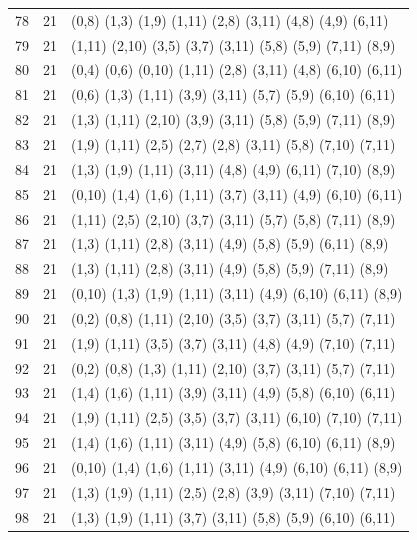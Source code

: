 \begin{appendix}
{\begin{longtable}{lll}
    78 & 21 & (0,8)   (1,3)   (1,9)   (1,11)  (2,8)   (3,11)  (4,8)   (4,9)   (6,11)\\
    79 & 21 & (1,11)  (2,10)  (3,5)   (3,7)   (3,11)  (5,8)   (5,9)   (7,11)  (8,9)\\
    80 & 21 & (0,4)   (0,6)   (0,10)  (1,11)  (2,8)   (3,11)  (4,8)   (6,10)  (6,11)\\
    81 & 21 & (0,6)   (1,3)   (1,11)  (3,9)   (3,11)  (5,7)   (5,9)   (6,10)  (6,11)\\
    82 & 21 & (1,3)   (1,11)  (2,10)  (3,9)   (3,11)  (5,8)   (5,9)   (7,11)  (8,9)\\
    83 & 21 & (1,9)   (1,11)  (2,5)   (2,7)   (2,8)   (3,11)  (5,8)   (7,10)  (7,11)\\
    84 & 21 & (1,3)   (1,9)   (1,11)  (3,11)  (4,8)   (4,9)   (6,11)  (7,10)  (8,9)\\
    85 & 21 & (0,10)  (1,4)   (1,6)   (1,11)  (3,7)   (3,11)  (4,9)   (6,10)  (6,11)\\
    86 & 21 & (1,11)  (2,5)   (2,10)  (3,7)   (3,11)  (5,7)   (5,8)   (7,11)  (8,9)\\
    87 & 21 & (1,3)   (1,11)  (2,8)   (3,11)  (4,9)   (5,8)   (5,9)   (6,11)  (8,9)\\
    88 & 21 & (1,3)   (1,11)  (2,8)   (3,11)  (4,9)   (5,8)   (5,9)   (7,11)  (8,9)\\
    89 & 21 & (0,10)  (1,3)   (1,9)   (1,11)  (3,11)  (4,9)   (6,10)  (6,11)  (8,9)\\
    90 & 21 & (0,2)   (0,8)   (1,11)  (2,10)  (3,5)   (3,7)   (3,11)  (5,7)   (7,11)\\
    91 & 21 & (1,9)   (1,11)  (3,5)   (3,7)   (3,11)  (4,8)   (4,9)   (7,10)  (7,11)\\
    92 & 21 & (0,2)   (0,8)   (1,3)   (1,11)  (2,10)  (3,7)   (3,11)  (5,7)   (7,11)\\
    93 & 21 & (1,4)   (1,6)   (1,11)  (3,9)   (3,11)  (4,9)   (5,8)   (6,10)  (6,11)\\
    94 & 21 & (1,9)   (1,11)  (2,5)   (3,5)   (3,7)   (3,11)  (6,10)  (7,10)  (7,11)\\
    95 & 21 & (1,4)   (1,6)   (1,11)  (3,11)  (4,9)   (5,8)   (6,10)  (6,11)  (8,9)\\
    96 & 21 & (0,10)  (1,4)   (1,6)   (1,11)  (3,11)  (4,9)   (6,10)  (6,11)  (8,9)\\
    97 & 21 & (1,3)   (1,9)   (1,11)  (2,5)   (2,8)   (3,9)   (3,11)  (7,10)  (7,11)\\
    98 & 21 & (1,3)   (1,9)   (1,11)  (3,7)   (3,11)  (5,8)   (5,9)   (6,10)  (6,11)\\

\end{longtable}}
\end{appendix}
